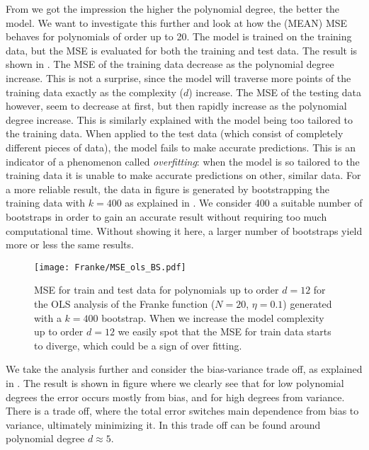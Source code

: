             From  we got the impression the higher the polynomial degree, the better the model. We want to investigate this further and look at how the (MEAN) MSE behaves for polynomials of order up to 20. The model is trained on the training data, but the MSE is evaluated for both the training and test data. The result is shown in . The MSE of the training data decrease as the polynomial degree increase. This is not a surprise, since the model will traverse more points of the training data exactly as the complexity ($d$) increase. The MSE of the testing data however, seem to decrease at first, but then rapidly increase as the polynomial degree increase. This is similarly explained with the model being too tailored to the training data. When applied to the test data (which consist of completely different pieces of data), the model fails to make accurate predictions. This is an indicator of a phenomenon called \textit{overfitting}: when the model is so tailored to the training data it is unable to make accurate predictions on other, similar data. For a more reliable result, the data in figure  is generated by bootstrapping the training data with $k=400$ as explained in . We consider 400 a suitable number of bootstraps in order to gain an accurate result without requiring too much computational time. Without showing it here, a larger number of bootstraps yield more or less the same results.

            \begin{figure}
                \texttt{[image: Franke/MSE\_ols\_BS.pdf]}
                \caption{MSE for train and test data for polynomials up to order $d=12$ for the OLS analysis of the Franke function ($N=20$, $\eta=0.1$) generated with a $k=400$ bootstrap. When we increase the model complexity  up to order $d=12$ we easily  spot that the MSE for train data starts to diverge, which could be a sign of over fitting.}
                \label{fig:model_complexity_ols}
            \end{figure}

            We take the analysis further and consider the bias-variance trade off, as explained in . The result is shown in figure   where we clearly see that for low polynomial degrees the error occurs mostly from bias, and for high degrees from  variance. There is a trade off, where the  total error switches  main dependence from bias to variance, ultimately minimizing it. In  this  trade off can be found around polynomial degree $d\approx 5$.

